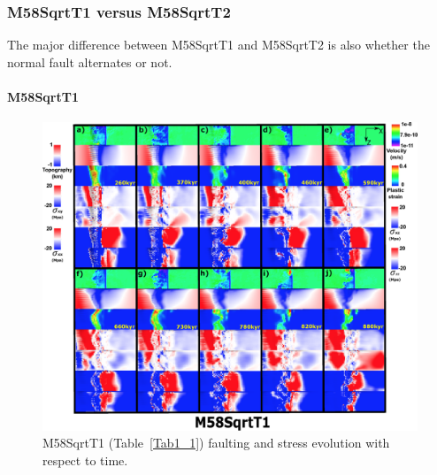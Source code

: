 \subsubsection{M58SqrtT1 versus M58SqrtT2}

The major difference between M58SqrtT1 and M58SqrtT2 is also whether the normal fault alternates or not.

\paragraph{M58SqrtT1}\label{para_M58SqrtT1}

\begin{figure}[h]
 \centering
  \includegraphics[width=1.0\textwidth]{./Figures/fig_Results_Weakening_7_M58SqrtT1_time_evolution.eps}
 \caption{M58SqrtT1 (Table~\hyperref[Tab1_1]{\ref{Tab1_1}}) faulting and stress evolution with respect to time.}
\label{fig_Results_Weakenging_7}
\end{figure}

